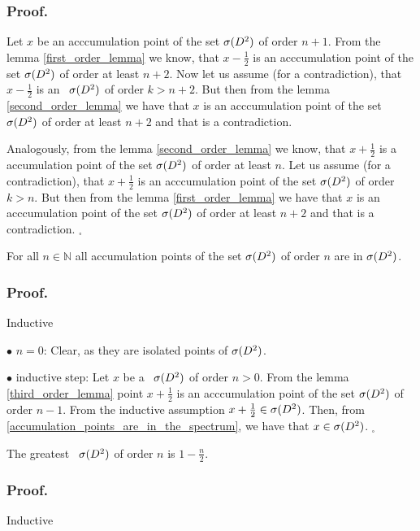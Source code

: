\subsubsection{Proof.} 

Let $x$ be an acccumulation point of the set ${{\sigma}(D^2)}$ of order $n+1$. From the lemma 
 \ref{first_order_lemma} we know, that $x - \frac{1}{2}$ is an acccumulation point of the set 
 ${{\sigma}(D^2)}$ of order at least $n+2$. Now let us assume (for a contradiction), that $x - \frac{1}{2}$ 
 is an \apots\ ${{\sigma}(D^2)}$ of order $k>n+2$. But then from the lemma \ref{second_order_lemma} 
 we have that $x$ is an acccumulation point of the set ${{\sigma}(D^2)}$ of order at least $n+2$ and that 
 is a contradiction. 
 
Analogously, from the lemma \ref{second_order_lemma} we know, that $x + \frac{1}{2}$ is a 
accumulation point of the set ${{\sigma}(D^2)}$ of order at least $n$. Let us assume (for a contradiction), 
that $x+ \frac{1}{2}$ is an acccumulation point of the set ${{\sigma}(D^2)}$ of order $k>n$. But then 
from the lemma \ref{first_order_lemma} we have that $x$ is an acccumulation point of 
the set ${{\sigma}(D^2)}$ 
of order at least $n+2$ and that is a contradiction. $_\square$ 
\begin{lemma}\label{accumulation_points_of_the_set}
For all $n \in \mathbb{N}$ all accumulation points of the set ${{\sigma}(D^2)}$ of order $n$ are in ${{\sigma}(D^2)}$.
\end{lemma}
\subsubsection{Proof.}
Inductive 

$\bullet$ $n=0$: Clear, as they are isolated points of ${{\sigma}(D^2)}$. 

$\bullet$ inductive step: Let $x$ be a \apots\  ${{\sigma}(D^2)}$ of order $n>0$. From the lemma 
\ref{third_order_lemma} point $x+\frac{1}{2}$ is an acccumulation point of the set ${{\sigma}(D^2)}$  
of order $n-1$. From the inductive assumption $x+\frac{1}{2} \in {{\sigma}(D^2)}$. Then, 
from \ref{accumulation_points_are_in_the_spectrum}, we have that $x \in {{\sigma}(D^2)}$. 
$_\square$ 

\begin{theorem}\label{greatest \apots}
The greatest \apots\ ${{\sigma}(D^2)}$ of order $n$ is $1-\frac{n}{2}$.
\end{theorem}
\subsubsection{Proof.}
Inductive 

